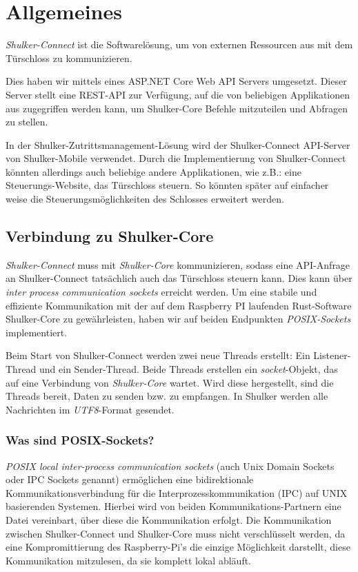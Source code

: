 \lstset{language=[Sharp]C}
\chapter{Allgemeines}
\textit{Shulker-Connect} ist die Softwarelösung, um von externen Ressourcen aus mit dem Türschloss zu kommunizieren.

Dies haben wir mittels eines ASP.NET Core Web API Servers umgesetzt. Dieser Server stellt eine REST-API zur Verfügung, 
auf die von beliebigen Applikationen aus zugegriffen werden kann, um Shulker-Core Befehle mitzuteilen und Abfragen zu stellen.

In der Shulker-Zutrittsmanagement-Lösung wird der Shulker-Connect API-Server von Shulker-Mobile verwendet. 
Durch die Implementierung von Shulker-Connect könnten allerdings auch beliebige andere Applikationen, 
wie z.B.: eine Steuerungs-Website, das Türschloss steuern. 
So könnten später auf einfacher weise die Steuerungsmöglichkeiten des Schlosses erweitert werden.

\section{Verbindung zu Shulker-Core}
\textit{Shulker-Connect} muss mit \textit{Shulker-Core} kommunizieren, sodass eine API-Anfrage an Shulker-Connect tatsächlich
auch das Türschloss steuern kann.
Dies kann über \textit{inter process communication sockets} erreicht werden. 
Um eine stabile und effiziente Kommunikation mit der auf dem Raspberry PI laufenden Rust-Software Shulker-Core zu 
gewährleisten, haben wir auf beiden Endpunkten \textit{POSIX-Sockets} implementiert.

Beim Start von Shulker-Connect werden zwei neue Threads erstellt: Ein Listener-Thread und ein Sender-Thread.
Beide Threads erstellen ein \textit{socket}-Objekt, das auf eine Verbindung von \textit{Shulker-Core} wartet.
Wird diese hergestellt, sind die Threads bereit, Daten zu senden bzw. zu empfangen.
In Shulker werden alle Nachrichten im \textit{UTF8}-Format gesendet.

\subsection{Was sind POSIX-Sockets?}
\textit{POSIX local inter-process communication sockets} (auch Unix Domain Sockets oder IPC Sockets genannt) ermöglichen
eine bidirektionale Kommunikationsverbindung für die Interprozesskommunikation (IPC) auf UNIX basierenden Systemen.
Hierbei wird von beiden Kommunikations-Partnern eine Datei vereinbart, über diese die Kommunikation erfolgt. \cite{ipcsockets}
Die Kommunikation zwischen Shulker-Connect und Shulker-Core muss nicht verschlüsselt werden, da eine Kompromittierung des
Raspberry-Pi's die einzige Möglichkeit darstellt, diese Kommunikation mitzulesen, da sie komplett lokal abläuft. 


